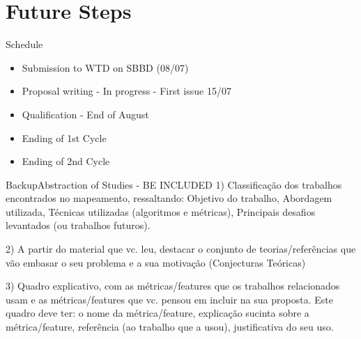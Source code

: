 \documentclass[aspectratio=169,10pt,xcolor={dvipsnames}]{beamer}
\begin{document}
  

  
\section{Future Steps}
\begin{frame}{Schedule}
  \begin{itemize}
    \item Submission to WTD on SBBD (08/07)
    \item Proposal writing - In progress - First issue 15/07
    \item Qualification - End of August
    \item Ending of 1st Cycle
    \item Ending of 2nd Cycle
  \end{itemize}
\end{frame}

\begin{frame}{Backup}{Abstraction of Studies} - BE INCLUDED
    1) Classificação dos trabalhos encontrados no mapeamento, ressaltando: Objetivo do trabalho, Abordagem utilizada, Técnicas utilizadas (algoritmos e métricas), Principais desafios levantados (ou trabalhos futuros). 
    
  
    2) A partir do material que vc. leu, destacar o conjunto de teorias/referências que vão embasar o seu problema e a sua motivação (Conjecturas Teóricas)
    
    
    3) Quadro explicativo, com as métricas/features que os trabalhos relacionados usam e as métricas/features que vc. pensou em incluir na sua proposta. Este quadro deve ter: o nome da métrica/feature, explicação sucinta sobre a métrica/feature, referência (ao trabalho que a usou), justificativa do seu uso. 
    
  \end{frame}
\end{document}
